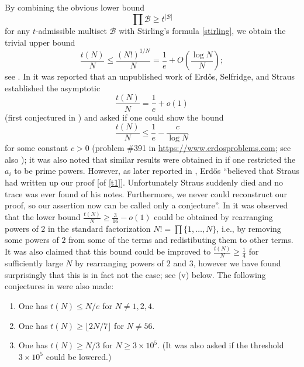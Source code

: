 \documentclass[12pt,a4paper,reqno]{amsart}
\numberwithin{equation}{section}
\theoremstyle{plain}
\theoremstyle{definition}
\newcommand\tuple{{\mathcal B}}
\begin{document}
By combining the obvious lower bound
\begin{equation}\label{obvious}
 \prod \tuple \geq t^{|\tuple|}
\end{equation}
for any $t$-admissible multiset $\tuple$ with Stirling's formula \eqref{stirling}, we obtain the trivial upper bound
\begin{equation}\label{trivial} \frac{t(N)}{N} \leq \frac{(N!)^{1/N}}{N} = \frac{1}{e} + O\left( \frac{\log N}{N}\right);
\end{equation}
see .  In \cite[p.75]{erdos-graham} it was reported that an unpublished work of Erd\H{o}s, Selfridge, and Straus established the asymptotic
\begin{equation}\label{t1}
  \frac{t(N)}{N} = \frac{1}{e} + o(1)
\end{equation}
(first conjectured in \cite{erdos-71}) and asked if one could show the bound
\begin{equation}\label{Tbound}
   \frac{t(N)}{N} \leq \frac{1}{e} - \frac{c}{\log N}
\end{equation}
for some constant $c>0$ (problem {\#}391 in \url{https://www.erdosproblems.com}; see also \cite[Section B22, p. 122--123]{guy}); it was also noted that similar results were obtained in \cite{algr77} if one restricted the $a_i$ to be prime powers.  However, as later reported in \cite{erdos-96}, Erd\H{o}s ``believed that Straus had written up our proof [of \eqref{t1}]. Unfortunately Straus suddenly died and no trace was ever found of his notes. Furthermore, we never could reconstruct our proof, so our assertion now can be called only a conjecture''.   In \cite{guy} it was observed that the lower bound $\frac{t(N)}{N} \geq \frac{3}{16}-o(1)$ could be obtained by rearranging powers of $2$ in the standard factorization $N! = \prod \{1,\dots,N\}$, i.e., by removing some powers of $2$ from some of the terms and redistibuting them to other terms.  It was also claimed that this bound could be improved to $\frac{t(N)}{N} \geq \frac{1}{4}$ for sufficiently large $N$ by rearranging powers of $2$ and $3$, however we have found surprisingly that this is in fact not the case; see (v) below.  The following conjectures in \cite{guy} were also made:
\begin{enumerate}
\item One has $t(N) \leq N/e$ for $N \neq 1,2,4$.
\item One has $t(N) \geq \lfloor 2N/7 \rfloor$ for $N \neq 56$.
\item One has $t(N) \geq N/3$ for $N \geq 3 \times 10^5$.  (It was also asked if the threshold $3 \times 10^5$ could be lowered.) 
\end{enumerate}
\end{document}
